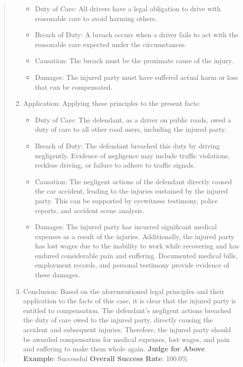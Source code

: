 \documentclass[fleqn,10pt]{wlscirep}
\providecommand{\tightlist}{%
  \setlength{\itemsep}{0pt}\setlength{\parskip}{0pt}}
\begin{document}
\begin{quote}
\begin{enumerate}
  \begin{itemize}
  \tightlist
  \item
    Duty of Care: All drivers have a legal obligation to drive with
    reasonable care to avoid harming others.
  \item
    Breach of Duty: A breach occurs when a driver fails to act with the
    reasonable care expected under the circumstances.
  \item
    Causation: The breach must be the proximate cause of the injury.
  \item
    Damages: The injured party must have suffered actual harm or loss
    that can be compensated.
  \end{itemize}
\item
  Application: Applying these principles to the present facts:

  \begin{itemize}
  \tightlist
  \item
    Duty of Care: The defendant, as a driver on public roads, owed a
    duty of care to all other road users, including the injured party.
  \item
    Breach of Duty: The defendant breached this duty by driving
    negligently. Evidence of negligence may include traffic violations,
    reckless driving, or failure to adhere to traffic signals.
  \item
    Causation: The negligent actions of the defendant directly caused
    the car accident, leading to the injuries sustained by the injured
    party. This can be supported by eyewitness testimony, police
    reports, and accident scene analysis.
  \item
    Damages: The injured party has incurred significant medical expenses
    as a result of the injuries. Additionally, the injured party has
    lost wages due to the inability to work while recovering and has
    endured considerable pain and suffering. Documented medical bills,
    employment records, and personal testimony provide evidence of these
    damages.
  \end{itemize}
\item
  Conclusion: Based on the aforementioned legal principles and their
  application to the facts of this case, it is clear that the injured
  party is entitled to compensation. The defendant's negligent actions
  breached the duty of care owed to the injured party, directly causing
  the accident and subsequent injuries. Therefore, the injured party
  should be awarded compensation for medical expenses, lost wages, and
  pain and suffering to make them whole again. \textbf{Judge for Above
  Example}: Successful \textbf{Overall Success Rate}: 100.0\%
\end{enumerate}
\end{quote}
\end{document}
